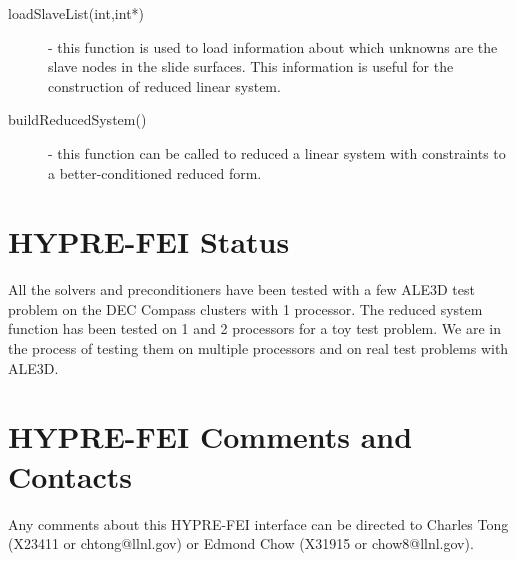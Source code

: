 \begin{description}
\item[loadSlaveList(int,int*)] - this function is used to load information
                        about which unknowns are the slave nodes in the
                        slide surfaces.  This information is useful for
                        the construction of reduced linear system.
\item[buildReducedSystem() ] - this function can be called to reduced a linear
                        system with constraints to a better-conditioned reduced
                        form.
\end{description}

\section{HYPRE-FEI Status}

All the solvers and preconditioners have been tested with a few ALE3D test
problem on the DEC Compass clusters with 1 processor.  The reduced system
function has been tested on 1 and 2 processors for a toy test problem.  We
are in the process of testing them on multiple processors and on real test
problems with ALE3D.

\section{HYPRE-FEI Comments and Contacts}

Any comments about this HYPRE-FEI interface can be directed to Charles Tong
(X23411 or chtong@llnl.gov) or Edmond Chow (X31915 or chow8@llnl.gov).

